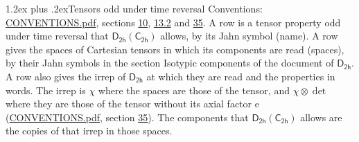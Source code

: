 \documentclass[10pt,a4paper]{article}
\makeatletter
\renewcommand\section{\@startsection{section}{1}{\z@}{-3ex plus -1ex minus -.2ex}%
  {1.2ex plus .2ex}{\normalfont\large\sffamily\bfseries\color{parttitle}}}
\numberwithin{equation}{section}
\newcommand{\grp}[1]{\mathsf{#1}}
\newcommand{\irrprod}{\otimes}
\makeatother
\begin{document}
\section{Tensors odd under time reversal}\label{s:time_odd}
Conventions: \href{../../CONVENTIONS.pdf}{CONVENTIONS.pdf}, sections \href{../../../rotation/CONVENTIONS.pdf\#conv.10}{10}, \href{../../../rotation/CONVENTIONS.pdf\#conv.13.2}{13.2} and \href{../../CONVENTIONS.pdf\#conv.35}{35}.
\leavevmode\label{n:head.name.property}A row is a tensor property odd under time reversal that $\grp{D_{2h}}(\grp{C_{2h}})$ allows, by its Jahn symbol (name). \label{n:head.spaces}A row gives the spaces of Cartesian tensors in which its components are read (spaces), by their Jahn symbols in the section Isotypic components of the document of \href{../../../rotation/data/pdf/D2h.pdf}{$\grp{D_{2h}}$}. \label{n:head.properties}A row also gives the irrep of $\grp{D_{2h}}$ at which they are read and the properties in words. The irrep is $\chi$ where the spaces are those of the tensor, and $\chi \irrprod \det$ where they are those of the tensor without its axial factor e (\href{../../CONVENTIONS.pdf}{CONVENTIONS.pdf}, section \href{../../CONVENTIONS.pdf\#conv.35}{35}). The components that $\grp{D_{2h}}(\grp{C_{2h}})$ allows are the copies of that irrep in those spaces.
\end{document}
